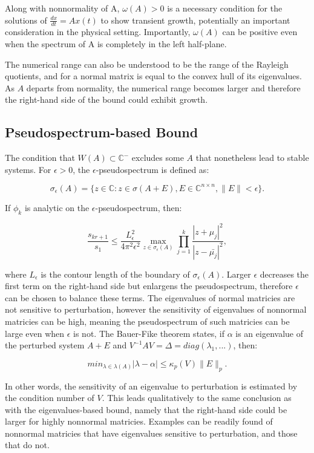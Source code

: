 \documentclass[12pt]{scrartcl}
\begin{document}
Along with nonnormality of A, $\omega(A)>0$ is a necessary condition for the solutions of $\frac{dx}{dt}=Ax(t)$ to show transient growth, potentially an important consideration in the physical setting. Importantly, $\omega(A)$ can be positive even when the spectrum of A is completely in the left half-plane.

The numerical range can also be understood to be the range of the Rayleigh quotients, and for a normal matrix is equal to the convex hull of its eigenvalues. As $A$ departs from normality, the numerical range becomes larger and therefore the right-hand side of the bound could exhibit growth.


\subsection{Pseudospectrum-based Bound}

The condition that $W(A) \subset \mathbb{C}^{-}$ excludes some $A$ that nonetheless lead to stable systems. For $\epsilon > 0$, the $\epsilon$-pseudospectrum is defined as: 

$$\sigma_{\epsilon}(A)= \{ z \in \mathbb{C} : z \in \sigma (A+E), E \in \mathbb{C}^{n \times n}, \|E\| < \epsilon \}.$$ 

If $\phi_{k}$ is analytic on the $\epsilon$-pseudospectrum, then:

$$\frac{s_{kr+1}}{s_{1}} \leq \frac{L_{\epsilon}^{2}}{4\pi^{2}\epsilon^{2}} \max_{z \in \sigma_{\epsilon}(A)} \prod_{j=1}^{k} \frac{ | z + \mu_j |^{2}}{ | z - \bar{\mu_j} |^{2}} ,$$

where $L_{\epsilon}$ is the contour length of the boundary of $\sigma_{\epsilon}(A)$. Larger $\epsilon$ decreases the first term on the right-hand side but enlargens the pseudospectrum, therefore $\epsilon$ can be chosen to balance these terms.
The eigenvalues of normal matricies are not sensitive to perturbation, however the sensitivity of eigenvalues of nonnormal matricies can be high, meaning the pseudospectrum of such matricies can be large even when $\epsilon$ is not. The Bauer-Fike theorem states, if $\alpha$ is an eigenvalue of the perturbed system $A+E$ and $V^{-1}AV= \Delta =diag(\lambda_{1},...)$, then:

$$min_{\lambda \in \lambda(A)} | \lambda - \alpha | \leq \kappa_{p}(V) \|E\|_{p}.$$

In other words, the sensitivity of an eigenvalue to perturbation is estimated by the condition number of $V$. This leads qualitatively to the same conclusion as with the eigenvalues-based bound, namely that the right-hand side could be larger for highly nonnormal matricies. Examples can be readily found of nonnormal matricies that have eigenvalues sensitive to perturbation, and those that do not.
\end{document}
